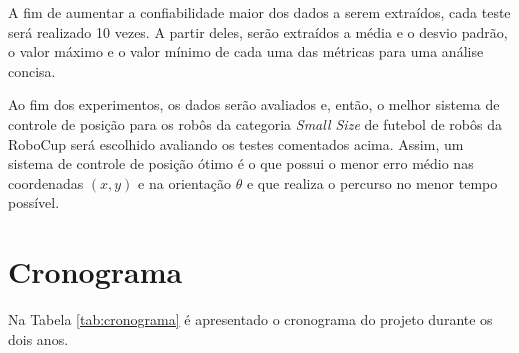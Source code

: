 \documentclass[acronym, symbols, table]{fei}
\begin{document}
		A fim de aumentar a confiabilidade maior dos dados a serem extraídos, cada teste será realizado 10 vezes. A partir deles, serão extraídos a média e o desvio padrão, o valor máximo e o valor mínimo de cada uma das métricas para uma análise concisa.
		
		Ao fim dos experimentos, os dados serão avaliados e, então, o melhor sistema de controle de posição para os robôs da categoria \textit{Small Size} de futebol de robôs da RoboCup será escolhido avaliando os testes comentados acima. Assim, um sistema de controle de posição ótimo é o que possui o menor erro médio nas coordenadas $(x, y)$ e na orientação $\theta$ e que realiza o percurso no menor tempo possível.
		
	\chapter{Cronograma}\label{sec:cronograma}
	
		\newcommand{\X}{\cellcolor{grey}}
		
		Na Tabela \ref{tab:cronograma} é apresentado o cronograma do projeto durante os dois anos.
		
\end{document}
